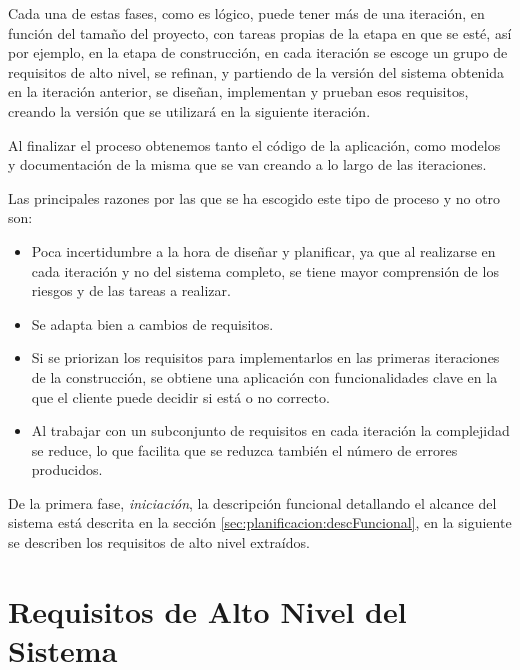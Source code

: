 Cada una de estas fases, como es lógico, puede tener más de una iteración, en función del tamaño del proyecto, con tareas propias de la etapa en que se esté, así por ejemplo, en la etapa de construcción, en cada iteración se escoge un grupo de requisitos de alto nivel, se refinan, y partiendo de la versión del sistema obtenida en la iteración anterior, se diseñan, implementan y prueban esos requisitos, creando la versión que se utilizará en la siguiente iteración.
\newline

Al finalizar el proceso obtenemos tanto el código de la aplicación, como modelos y documentación de la misma que se van creando a lo largo de las iteraciones.
\newline



Las principales razones por las que se ha escogido este tipo de proceso y no otro son:

\begin{itemize}

    \item[\ding{70}] Poca incertidumbre a la hora de diseñar y planificar, ya que al realizarse en cada iteración y no del sistema completo, se tiene mayor comprensión de los riesgos y de las tareas a realizar.

    \item[\ding{70}] Se adapta bien a cambios de requisitos.

    \item[\ding{70}] Si se priorizan los requisitos para implementarlos en las primeras iteraciones de la construcción, se obtiene una aplicación con funcionalidades clave en la que el cliente puede decidir si está o no correcto.

    \item[\ding{70}] Al trabajar con un subconjunto de requisitos en cada iteración la complejidad se reduce, lo que facilita que se reduzca también el número de errores producidos.

\end{itemize}

De la primera fase, \emph{iniciación}, la descripción funcional detallando el alcance del sistema está descrita en la sección \ref{sec:planificacion:descFuncional}, en la siguiente se describen los requisitos de alto nivel extraídos.



\section{Requisitos de Alto Nivel del Sistema}
\label{sec:planificacion:requisitos}

